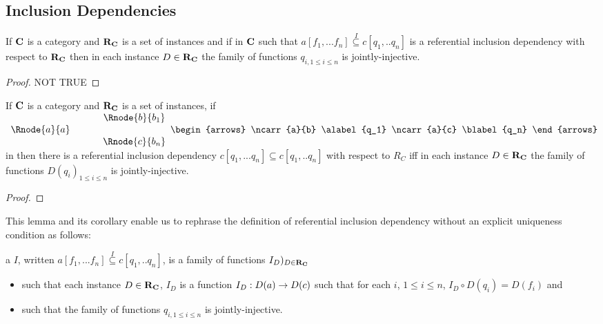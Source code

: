 \subsection{Inclusion Dependencies}
\begin{oldtt}
\begin{lemma}
If $\textbf{C}$ is a category and $\textbf{R}_{\textbf{C}}$ is a set of instances and if
\fnsourceqnsource
in $\textbf{C}$
such that $a[f_1,...f_n] \overset{I}{\subseteq} c[q_1,..q_n]$ is a referential inclusion dependency with respect  to $\textbf{R}_{\textbf{C}}$ then in each instance $D \in \textbf{R}_{\textbf{C}}$ the family of functions
$q_{i, 1 \leq i \leq n}$ is jointly-injective.
\end{lemma}
\begin{proof}
NOT TRUE
\end{proof}
\end{oldtt}

\newcommand {\qnsourcediag}{
$
\begin{array}{c p{0.5cm} c  }
             &&   \Rnode{b}{b_1} \\[0.01cm]
\Rnode{a}{a} &&                \\[0.01cm] 
             &&   \Rnode{c}{b_n}         
\end{array} 
\begin{arrows}
\ncarr{a}{b}
\alabel{q_1}
\ncarr{a}{c}
\blabel{q_n}
\end{arrows}
$  
}

\begin{lemma}
If $\textbf{C}$ is a  category and $\textbf{R}_{\textbf{C}}$ is a set of instances, if \qnsourcediag in \catcw
then there is a referential inclusion dependency $c[q_1,...q_n] \subseteq c[q_1,..q_n]$
with respect to $R_C$
iff in each instance $D \in \textbf{R}_{\textbf{C}}$ the family of functions $D(q_{i})_{1 \leq i \leq n}$ is jointly-injective.
\end{lemma}
\begin{proof}
\end{proof}

This lemma and its corollary  enable us to rephrase the definition of referential inclusion dependency 
without an explicit uniqueness condition as follows:
\begin{definition}
a  $I$, written $a[f_1,...f_n] \overset{I}{\subseteq} c[q_1,..q_n]$, is a family of functions $I_D)_{D \in \textbf{R}_{\textbf{C}}}$
\begin{itemize}
\item such that each instance $D \in \textbf{R}_{\textbf{C}}$, $I_D$ is a  function $I_D : D(a) \rightarrow D(c)$ such that for each $i$, $1 \leq i \le n$, $I_D \circ D(q_i) = D(f_i)$ and 
\item such that the family of functions $q_{i, 1 \leq i \leq n}$ is jointly-injective.
\end{itemize}
\end{definition}